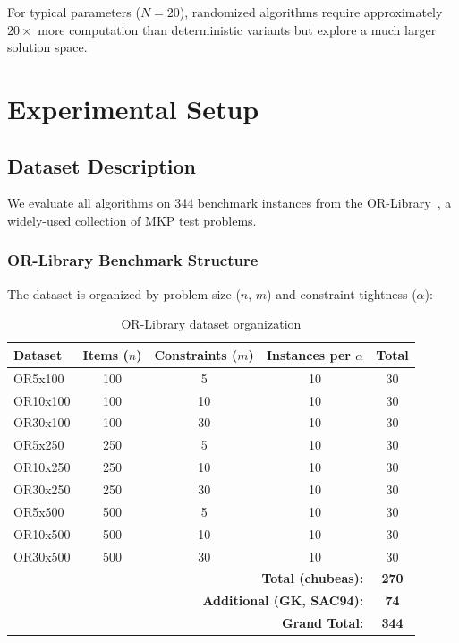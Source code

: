 \documentclass[12pt,a4paper]{article}
\begin{document}
For typical parameters ($N = 20$), randomized algorithms require approximately $20\times$ more computation than deterministic variants but explore a much larger solution space.

\section{Experimental Setup}
\label{sec:experimental}

\subsection{Dataset Description}

We evaluate all algorithms on 344 benchmark instances from the OR-Library~\cite{chu1998genetic}, a widely-used collection of MKP test problems.

\subsubsection{OR-Library Benchmark Structure}

The dataset is organized by problem size ($n$, $m$) and constraint tightness ($\alpha$):

\begin{table}[H]
\centering
\caption{OR-Library dataset organization}
\label{tab:dataset}
\begin{tabular}{lcccc}
\toprule
\textbf{Dataset} & \textbf{Items ($n$)} & \textbf{Constraints ($m$)} & \textbf{Instances per $\alpha$} & \textbf{Total} \\
\midrule
OR5x100 & 100 & 5 & 10 & 30 \\
OR10x100 & 100 & 10 & 10 & 30 \\
OR30x100 & 100 & 30 & 10 & 30 \\
OR5x250 & 250 & 5 & 10 & 30 \\
OR10x250 & 250 & 10 & 10 & 30 \\
OR30x250 & 250 & 30 & 10 & 30 \\
OR5x500 & 500 & 5 & 10 & 30 \\
OR10x500 & 500 & 10 & 10 & 30 \\
OR30x500 & 500 & 30 & 10 & 30 \\
\midrule
\multicolumn{4}{r}{\textbf{Total (chubeas):}} & \textbf{270} \\
\multicolumn{4}{r}{\textbf{Additional (GK, SAC94):}} & \textbf{74} \\
\midrule
\multicolumn{4}{r}{\textbf{Grand Total:}} & \textbf{344} \\
\bottomrule
\end{tabular}
\end{table}
\end{document}
